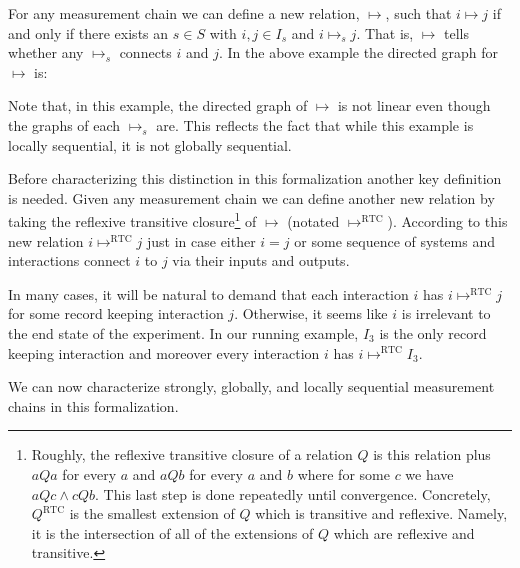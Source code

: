 \documentclass[12pt,prd,superscriptaddress,floatfix,amsmath,amssymb,amsfonts,nofootinbib]{revtex4-2}
\begin{document}
For any measurement chain we can define a new relation, $\mapsto$, such that $i\mapsto j$ if and only if there exists an $s\in S$ with $i,j\in I_s$ and $i \mapsto_s j$. That is, $\mapsto$ tells whether any $\mapsto_s$ connects $i$ and $j$. In the above example the directed graph for $\mapsto$ is:\\
\begin{center}
\end{center}
Note that, in this example, the directed graph of $\mapsto$ is not linear even though the graphs of each $\mapsto_s$ are. This reflects the fact that while this example is locally sequential, it is not globally sequential. 

Before characterizing this distinction in this formalization another key definition is needed. Given any measurement chain we can define another new relation by taking the reflexive transitive closure\footnote{Roughly, the reflexive transitive closure of a relation $Q$ is this relation plus $aQa$ for every $a$ and $aQb$ for every $a$ and $b$ where for some $c$ we have $aQc\land cQb$. This last step is done repeatedly until convergence. Concretely, $Q^\text{RTC}$ is the smallest extension of $Q$ which is transitive and reflexive. Namely, it is the intersection of all of the extensions of $Q$ which are reflexive and transitive.} of $\mapsto$ (notated $\mapsto^\text{RTC}$). According to this new relation $i\mapsto^\text{RTC}j$ just in case either $i=j$ or some sequence of systems and interactions connect $i$ to $j$ via their inputs and outputs. 

In many cases, it will be natural to demand that each interaction $i$ has $i\mapsto^\text{RTC} j$ for some record keeping interaction $j$. Otherwise, it seems like $i$ is irrelevant to the end state of the experiment. In our running example, $I_3$ is the only record keeping interaction and moreover every interaction $i$ has $i\mapsto^\text{RTC} I_3$.

We can now characterize strongly, globally, and locally sequential measurement chains in this formalization. 
\end{document}

